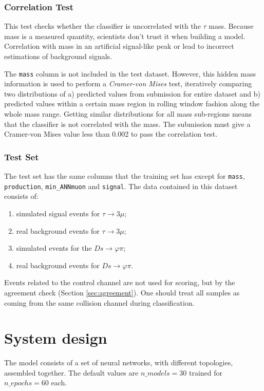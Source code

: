 \documentclass[conference]{IEEEtran}
\begin{document}
\subsubsection{Correlation Test}
\label{sec:correlation}
This test checks whether the classifier is uncorrelated with the $\tau$ mass.
Because mass is a measured quantity, scientists don't trust it when building a
model. Correlation with mass in an artificial signal-like peak or lead to
incorrect estimations of background signals.

The \texttt{mass} column is not included in the test dataset. However, this hidden
mass information is used to perform a \textit{Cramer-von Mises} test,
iteratively comparing two distributions of a) predicted values from submission
for entire dataset and b) predicted values within a certain mass region in
rolling window fashion along the whole mass range. Getting similar distributions
for all mass sub-regions means that the classifier is not correlated with the
mass. The submission must give a Cramer-von Mises value less than 0.002 to pass
the correlation test.

\subsubsection{Test Set}
\label{sec:test-set}
The test set has the same columns that the training set has except for
\texttt{mass}, \texttt{production}, \texttt{min\_ANNmuon} and \texttt{signal}.
The data contained in this dataset consists of:
\begin{enumerate}
	\item simulated signal events for $\tau \rightarrow 3\mu$;
	\item real background events for $\tau \rightarrow 3\mu$;
	\item simulated events for the $Ds \rightarrow \varphi\pi$;
	\item real background events for $Ds \rightarrow \varphi\pi$.
\end{enumerate}
Events related to the control channel are not used for scoring, but by the
agreement check (Section \ref{sec:agreement}). One should treat all samples as
coming from the same collision channel during classification.

\section{System design}
\label{sec:system_design}
The model consists of a set of neural networks, with different topologies, assembled together. The default values are $n\_models = 30$ trained for $n\_epochs = 60$ each.
\end{document}
